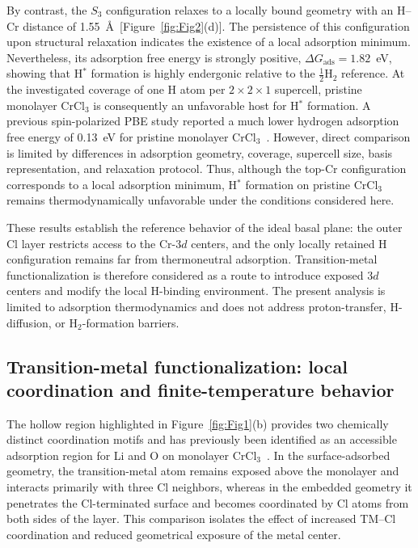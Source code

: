 \documentclass[journal=jacsat,manuscript=article]{achemso}
\begin{document}
By contrast, the $S_3$ configuration relaxes to a locally bound geometry with an H--Cr distance of 1.55~\AA\ [Figure~\ref{fig:Fig2}(d)]. The persistence of this configuration upon structural relaxation indicates the existence of a local adsorption minimum. Nevertheless, its adsorption free energy is strongly positive, $\Delta G_{\mathrm{ads}}=1.82$~eV, showing that H$^*$ formation is highly endergonic relative to the $\frac{1}{2}$H$_2$ reference. At the investigated coverage of one H atom per $2\times2\times1$ supercell, pristine monolayer CrCl$_3$ is consequently an unfavorable host for H$^*$ formation. A previous spin-polarized PBE study reported a much lower hydrogen adsorption free energy of 0.13~eV for pristine monolayer CrCl$_3$~\cite{Zala2024}. However, direct comparison is limited by differences in adsorption geometry, coverage, supercell size, basis representation, and relaxation protocol. Thus, although the top-Cr configuration corresponds to a local adsorption minimum, H$^*$ formation on pristine CrCl$_3$ remains thermodynamically unfavorable under the conditions considered here.

These results establish the reference behavior of the ideal basal plane: the outer Cl layer restricts access to the Cr-$3d$ centers, and the only locally retained H configuration remains far from thermoneutral adsorption. Transition-metal functionalization is therefore considered as a route to introduce exposed $3d$ centers and modify the local H-binding environment. The present analysis is limited to adsorption thermodynamics and does not address proton-transfer, H-diffusion, or H$_2$-formation barriers.

\subsection{Transition-metal functionalization: local coordination and finite-temperature behavior}

\noindent The hollow region highlighted in Figure~\ref{fig:Fig1}(b) provides two chemically distinct coordination motifs and has previously been identified as an accessible adsorption region for Li and O on monolayer CrCl$_3$~\cite{Luo2020,Mastrippolito2022}. In the surface-adsorbed geometry, the transition-metal atom remains exposed above the monolayer and interacts primarily with three Cl neighbors, whereas in the embedded geometry it penetrates the Cl-terminated surface and becomes coordinated by Cl atoms from both sides of the layer. This comparison isolates the effect of increased TM--Cl coordination and reduced geometrical exposure of the metal center.
\end{document}
